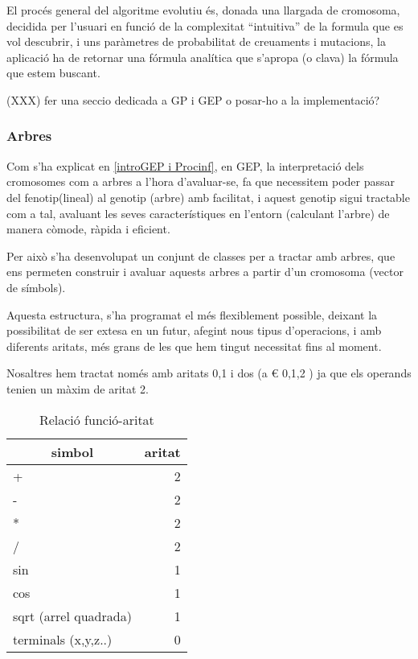 \documentclass[titlepage,a4paper,12pt]{book}
\begin{document}
El procés general del algoritme evolutiu és, donada una llargada de cromosoma,
decidida per l'usuari en funció de la complexitat ``intuitiva'' de la formula
que es vol descubrir, i uns paràmetres de probabilitat de creuaments i
mutacions, la aplicació ha de retornar una fórmula analítica que s'apropa (o
clava) la fórmula que estem buscant.

(XXX) fer una seccio dedicada a GP i GEP o posar-ho a la implementació?

\subsubsection{Arbres} %
\label{ssub:Arbres}

Com s'ha explicat en \ref{introGEP i Procinf}, en GEP, la interpretació dels
cromosomes com a arbres a l'hora d'avaluar-se, fa que necessitem poder passar
del fenotip(lineal) al genotip (arbre) amb facilitat, i aquest genotip sigui
tractable com a tal, avaluant les seves característiques en l'entorn (calculant
l'arbre) de manera còmode, ràpida i eficient.

Per això s'ha desenvolupat un conjunt de classes per a tractar amb arbres, que
ens permeten construir i avaluar aquests arbres a partir d'un cromosoma (vector
de símbols).

Aquesta estructura, s'ha programat el més flexiblement possible, deixant la
possibilitat de ser extesa en un futur, afegint nous tipus d'operacions, i amb
diferents aritats, més grans de les que hem tingut necessitat fins al moment.

Nosaltres hem tractat només amb aritats 0,1 i dos (a € {0,1,2} ) ja que els
operands tenien un màxim de aritat 2.



\begin{table}
\centering
\caption{Relació funció-aritat}
\begin{tabular}{|l|r|}
\hline
\multicolumn{1}{|c|}{\textbf{simbol }} & \multicolumn{1}{c|}{\textbf{ aritat}} \\
\hline
\hline
+                     & 2 \\
-                     & 2 \\
*                     & 2 \\
/                     & 2 \\
sin                   & 1 \\
cos                   & 1 \\
sqrt (arrel quadrada) & 1 \\
terminals (x,y,z..)   & 0 \\
\hline
\end{tabular}
\end{table}
\end{document}
